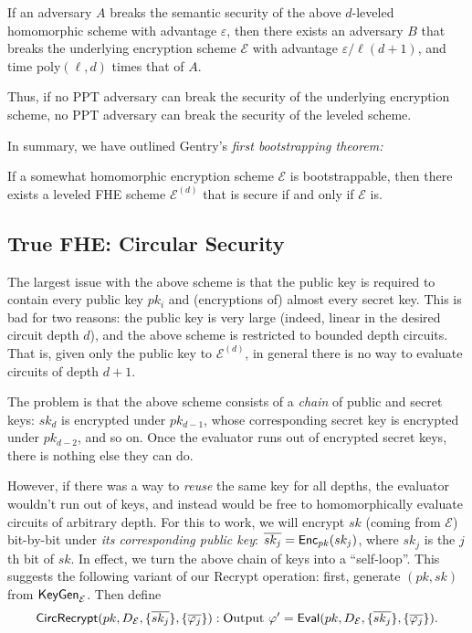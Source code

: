 \begin{theorem}
If an adversary $A$ breaks the semantic security of the above $d$-leveled homomorphic scheme with advantage $\varepsilon$, then there exists an adversary $B$ that breaks the underlying encryption scheme $\mathcal{E}$ with advantage $\varepsilon / \ell (d + 1)$, and time poly$(\ell, d)$ times that of $A$.
\end{theorem}

Thus, if no PPT adversary can break the security of the underlying encryption scheme, no PPT adversary can break the security of the leveled scheme.

In summary, we have outlined Gentry's \emph{first bootstrapping theorem:}

\begin{theorem}
    If a somewhat homomorphic encryption scheme $\mathcal{E}$ is bootstrappable, then there exists a leveled FHE scheme $\mathcal{E}^{(d)}$ that is secure if and only if $\mathcal{E}$ is.
\end{theorem}

\subsection{True FHE: Circular Security}
\label{sec: circ}

The largest issue with the above scheme is that the public key is required to contain every public key $pk_i$ and (encryptions of) almost every secret key. This is bad for two reasons: the public key is very large (indeed, linear in the desired circuit depth $d$), and the above scheme is restricted to bounded depth circuits. That is, given only the public key to $\mathcal{E}^{(d)}$, in general there is no way to evaluate circuits of depth $d + 1$.

The problem is that the above scheme consists of a \emph{chain} of public and secret keys: $sk_d$ is encrypted under $pk_{d - 1}$, whose corresponding secret key is encrypted under $pk_{d - 2}$, and so on. Once the evaluator runs out of encrypted secret keys, there is nothing else they can do.

However, if there was a way to \emph{reuse} the same key for all depths, the evaluator wouldn't run out of keys, and instead would be free to homomorphically evaluate circuits of arbitrary depth. For this to work, we will encrypt $sk$ (coming from $\mathcal{E}$) bit-by-bit under \emph{its corresponding public key}: $\overline{sk_j} = {\sf Enc}_{pk}(sk_j)$, where $sk_j$ is the $j$th bit of $sk$. In effect, we turn the above chain of keys into a ``self-loop''. This suggests the following variant of our Recrypt operation: first, generate $(pk, sk)$ from ${\sf KeyGen}_\mathcal{E}$. Then define
\[{\sf CircRecrypt}(pk, D_\mathcal{E}, \{\overline{sk_{j}}\}, \{\overline{\varphi_{j}}\}): \text{Output } \varphi' = {\sf Eval}(pk, D_\mathcal{E}, \{\overline{sk_{j}}\}, \{\overline{\varphi_{j}}\}).\]


